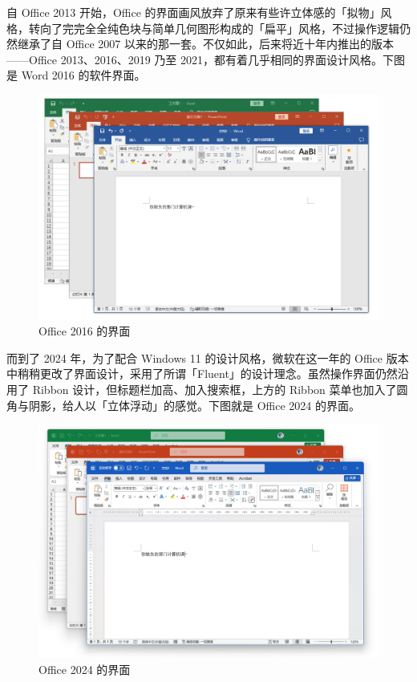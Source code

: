 自 Office 2013 开始，Office 的界面画风放弃了原来有些许立体感的「拟物」风格，转向了完完全全纯色块与简单几何图形构成的「扁平」风格，不过操作逻辑仍然继承了自 Office 2007 以来的那一套。不仅如此，后来将近十年内推出的版本——Office 2013、2016、2019 乃至 2021，都有着几乎相同的界面设计风格。下图是 Word 2016 的软件界面。

\begin{figure}[htb!]
  \centering
  \includegraphics[width=.82\textwidth]{assets/software/Office_2016.png}
  \caption{Office 2016 的界面}
  \label{fig:Office_2016}
\end{figure}

而到了 2024 年，为了配合 Windows 11 的设计风格，微软在这一年的 Office 版本中稍稍更改了界面设计，采用了所谓「Fluent」的设计理念。虽然操作界面仍然沿用了 Ribbon 设计，但标题栏加高、加入搜索框，上方的 Ribbon 菜单也加入了圆角与阴影，给人以「立体浮动」的感觉。下图就是 Office 2024 的界面。

\begin{figure}[htb!]
  \centering
  \includegraphics[width=.82\textwidth]{assets/software/Office_2024.png}
  \caption{Office 2024 的界面}
  \label{fig:Office_2024}
\end{figure}

